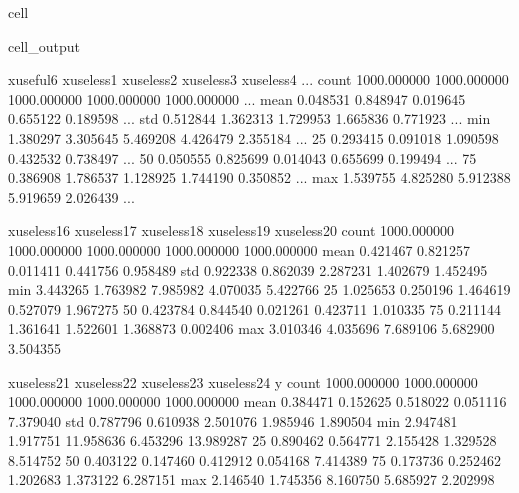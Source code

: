 \documentclass[letterpaper,10pt,english]{jupyterBook}
\begin{document}
\begin{sphinxuseclass}{cell}
\begin{sphinxVerbatimOutput}
\begin{sphinxuseclass}{cell_output}
\begin{sphinxVerbatim}[commandchars=\\\{\}]
        x\PYGZus{}useful\PYGZus{}6  x\PYGZus{}useless\PYGZus{}1  x\PYGZus{}useless\PYGZus{}2  x\PYGZus{}useless\PYGZus{}3  x\PYGZus{}useless\PYGZus{}4  ...  \PYGZbs{}
count  1000.000000  1000.000000  1000.000000  1000.000000  1000.000000  ...   
mean      0.048531     0.848947     0.019645     0.655122    \PYGZhy{}0.189598  ...   
std       0.512844     1.362313     1.729953     1.665836     0.771923  ...   
min      \PYGZhy{}1.380297    \PYGZhy{}3.305645    \PYGZhy{}5.469208    \PYGZhy{}4.426479    \PYGZhy{}2.355184  ...   
25\PYGZpc{}      \PYGZhy{}0.293415    \PYGZhy{}0.091018    \PYGZhy{}1.090598    \PYGZhy{}0.432532    \PYGZhy{}0.738497  ...   
50\PYGZpc{}       0.050555     0.825699     0.014043     0.655699    \PYGZhy{}0.199494  ...   
75\PYGZpc{}       0.386908     1.786537     1.128925     1.744190     0.350852  ...   
max       1.539755     4.825280     5.912388     5.919659     2.026439  ...   

       x\PYGZus{}useless\PYGZus{}16  x\PYGZus{}useless\PYGZus{}17  x\PYGZus{}useless\PYGZus{}18  x\PYGZus{}useless\PYGZus{}19  x\PYGZus{}useless\PYGZus{}20  \PYGZbs{}
count   1000.000000   1000.000000   1000.000000   1000.000000   1000.000000   
mean      \PYGZhy{}0.421467      0.821257     \PYGZhy{}0.011411      0.441756     \PYGZhy{}0.958489   
std        0.922338      0.862039      2.287231      1.402679      1.452495   
min       \PYGZhy{}3.443265     \PYGZhy{}1.763982     \PYGZhy{}7.985982     \PYGZhy{}4.070035     \PYGZhy{}5.422766   
25\PYGZpc{}       \PYGZhy{}1.025653      0.250196     \PYGZhy{}1.464619     \PYGZhy{}0.527079     \PYGZhy{}1.967275   
50\PYGZpc{}       \PYGZhy{}0.423784      0.844540      0.021261      0.423711     \PYGZhy{}1.010335   
75\PYGZpc{}        0.211144      1.361641      1.522601      1.368873      0.002406   
max        3.010346      4.035696      7.689106      5.682900      3.504355   

       x\PYGZus{}useless\PYGZus{}21  x\PYGZus{}useless\PYGZus{}22  x\PYGZus{}useless\PYGZus{}23  x\PYGZus{}useless\PYGZus{}24            y  
count   1000.000000   1000.000000   1000.000000   1000.000000  1000.000000  
mean      \PYGZhy{}0.384471     \PYGZhy{}0.152625     \PYGZhy{}0.518022      0.051116    \PYGZhy{}7.379040  
std        0.787796      0.610938      2.501076      1.985946     1.890504  
min       \PYGZhy{}2.947481     \PYGZhy{}1.917751    \PYGZhy{}11.958636     \PYGZhy{}6.453296   \PYGZhy{}13.989287  
25\PYGZpc{}       \PYGZhy{}0.890462     \PYGZhy{}0.564771     \PYGZhy{}2.155428     \PYGZhy{}1.329528    \PYGZhy{}8.514752  
50\PYGZpc{}       \PYGZhy{}0.403122     \PYGZhy{}0.147460     \PYGZhy{}0.412912      0.054168    \PYGZhy{}7.414389  
75\PYGZpc{}        0.173736      0.252462      1.202683      1.373122    \PYGZhy{}6.287151  
max        2.146540      1.745356      8.160750      5.685927     2.202998  


\end{sphinxVerbatim}
\end{sphinxuseclass}
\end{sphinxVerbatimOutput}
\end{sphinxuseclass}
\end{document}

